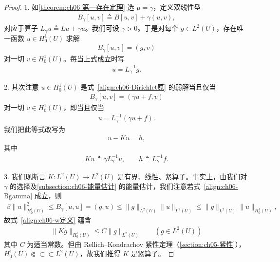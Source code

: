 \documentclass[../../main.tex]{subfiles}
\begin{document}
\begin{proof}
1. 如\cref{theorem:ch06-第一存在定理} 选 $\mu=\gamma$，定义双线性型
\begin{align*}
B_{\gamma}[u,v]\triangleq B[u,v]+\gamma(u,v),
\end{align*}
对应于算子 $L_{\gamma}u\triangleq Lu+\gamma u$。我们可设 $\gamma>0$。于是对每个 $g\in L^{2}(U)$，存在唯一函数 $u\in H^{1}_{0}(U)$ 求解
\begin{align}
B_{\gamma}[u,v]=(g,v)
\end{align}
对一切 $v\in H^{1}_{0}(U)$。每当上式成立时写
\begin{align}
u=L_{\gamma}^{-1}g.
\end{align}

2. 其次注意 $u\in H^{1}_{0}(U)$ 是式~\eqref{align:ch06-Dirichlet原} 的弱解当且仅当
\begin{align}
B_{\gamma}[u,v]=(\gamma u+f,v)
\end{align}
对一切 $v\in H^{1}_{0}(U)$，即当且仅当
\begin{align}
u=L_{\gamma}^{-1}(\gamma u+f).
\end{align}
我们把此等式改写为
\begin{align}
u-Ku=h,
\end{align}
其中
\begin{align}
Ku\triangleq\gamma L_{\gamma}^{-1}u,\qquad h\triangleq L_{\gamma}^{-1}f.
\end{align}

3. 我们现断言 $K:L^{2}(U)\to L^{2}(U)$ 是有界、线性、紧算子。事实上，由我们对 $\gamma$ 的选择及\cref{subsection:ch06-能量估计} 的能量估计，我们注意若式~\eqref{align:ch06-Bgamma} 成立，则
\begin{align*}
\beta\|u\|_{H^{1}_{0}(U)}^{2}\leqslant B_{\gamma}[u,u]=(g,u)\leqslant\|g\|_{L^{2}(U)}\|u\|_{L^{2}(U)}\leqslant\|g\|_{L^{2}(U)}\|u\|_{H^{1}_{0}(U)},
\end{align*}
故式~\eqref{align:ch06-w定义} 蕴含
\begin{align*}
\|Kg\|_{H^{1}_{0}(U)}\leqslant C\|g\|_{L^{2}(U)}\qquad (g\in L^{2}(U))
\end{align*}
其中 $C$ 为适当常数。但由 Rellich--Kondrachov 紧性定理（\cref{section:ch05-紧性}），$H^{1}_{0}(U)\Subset\subset \subset L^{2}(U)$，故我们推得 $K$ 是紧算子。


\end{proof}
\end{document}
